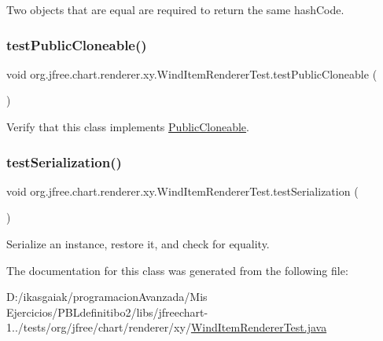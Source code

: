 Two objects that are equal are required to return the same hash\+Code. \mbox{\label{classorg_1_1jfree_1_1chart_1_1renderer_1_1xy_1_1_wind_item_renderer_test_a44a6231a76cbaa8e027017ffbdbe0e3d}} 
\subsubsection{\texorpdfstring{test\+Public\+Cloneable()}{testPublicCloneable()}}
{\footnotesize\ttfamily void org.\+jfree.\+chart.\+renderer.\+xy.\+Wind\+Item\+Renderer\+Test.\+test\+Public\+Cloneable (\begin{DoxyParamCaption}{ }\end{DoxyParamCaption})}

Verify that this class implements \mbox{\hyperlink{}{Public\+Cloneable}}. \mbox{\label{classorg_1_1jfree_1_1chart_1_1renderer_1_1xy_1_1_wind_item_renderer_test_a5d07bdf38b35cf331001102a6a02c6b5}} 
\subsubsection{\texorpdfstring{test\+Serialization()}{testSerialization()}}
{\footnotesize\ttfamily void org.\+jfree.\+chart.\+renderer.\+xy.\+Wind\+Item\+Renderer\+Test.\+test\+Serialization (\begin{DoxyParamCaption}{ }\end{DoxyParamCaption})}

Serialize an instance, restore it, and check for equality. 

The documentation for this class was generated from the following file\+:\begin{DoxyCompactItemize}
\item 
D\+:/ikasgaiak/programacion\+Avanzada/\+Mis Ejercicios/\+P\+B\+Ldefinitibo2/libs/jfreechart-\/1../tests/org/jfree/chart/renderer/xy/\mbox{\hyperlink{_wind_item_renderer_test_8java}{Wind\+Item\+Renderer\+Test.\+java}}\end{DoxyCompactItemize}
